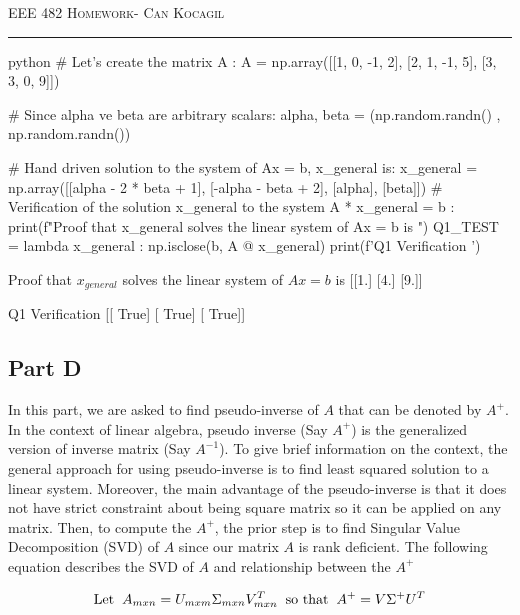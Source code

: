 \documentclass[12pt]{amsart}
\begin{document}
\newpage
{\scshape EEE 482} \hfill {\scshape \large  Homework-\relax} \hfill {\scshape Can Kocagil}
\smallskip
\hrule
\vspace{2mm}



\begin{mintedbox}{python}
# Let's create the matrix A :
A = np.array([[1, 0, -1, 2],
              [2, 1, -1, 5],
              [3, 3, 0, 9]])

# Since alpha ve beta are arbitrary scalars:
alpha, beta = (np.random.randn() , np.random.randn())

# Hand driven solution to the system of Ax = b, x_general is:
x_general = np.array([[alpha - 2 * beta + 1],
                      [-alpha - beta + 2],
                      [alpha],
                      [beta]])
# Verification of the solution x_general to the system A * x_general = b :
print(f"Proof that x_general solves the linear system of Ax = b is  \n")
Q1_TEST = lambda x_general : np.isclose(b, A @ x_general)
print(f'Q1 Verification ')


\end{mintedbox}

Proof that $x_{general}$ solves the linear system of $Ax = b$ is 
 [[1.]
 [4.]
 [9.]] 

Q1 Verification 
 [[ True]
 [ True]
 [ True]]

\subsection{Part D}

In this part, we are asked to find pseudo-inverse of $A$ that can be denoted by $A^+$. In the context of linear algebra, pseudo inverse (Say $A^+$) is the generalized version of inverse matrix (Say $A^{-1}$). To give brief information on the context, the general approach for using pseudo-inverse is to find least squared solution to a linear system. Moreover, the main advantage of the pseudo-inverse is that it does not have strict constraint about being square matrix so it can be applied on any matrix. Then, to compute the  $A^+$, the prior step is to find Singular Value Decomposition (SVD) of $A$ since our matrix $A$ is rank deficient. The following equation describes the SVD of $A$ and relationship between the $A^+$

\begin{equation}
    \text{Let} \hspace{2mm} A_{mxn} = U_{mxm}  \Sigma_{mxn}  V^T_{mxn}  \hspace{2mm} \text{so that} \hspace{2mm} A^{+} = V \Sigma_{}^+ U^T
\end{equation}
\end{document}

